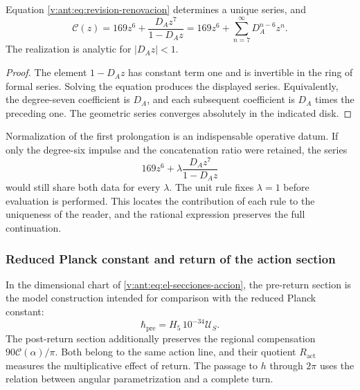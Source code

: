 \begin{proposition}
Equation \eqref{v:ant:eq:revision-renovacion} determines a unique series, and
\[
 \mathscr C(z)=169z^6+\frac{D_Az^7}{1-D_Az}
             =169z^6+\sum_{n=7}^{\infty}D_A^{n-6}z^n.
\]
The realization is analytic for \(|D_Az|<1\).
\end{proposition}
\begin{proof}
The element \(1-D_Az\) has constant term one and is invertible
in the ring of formal series. Solving the equation produces the displayed
series. Equivalently, the degree-seven coefficient is \(D_A\),
and each subsequent coefficient is \(D_A\) times the preceding one. The
geometric series converges absolutely in the indicated disk.
\end{proof}

Normalization of the first prolongation is an indispensable operative
datum. If only the degree-six impulse and the concatenation ratio
were retained, the series
\[
 169z^6+\lambda\frac{D_Az^7}{1-D_Az}
\]
would still share both data for every \(\lambda\).
The unit rule fixes \(\lambda=1\) before evaluation is performed.
This locates the contribution of each rule to the uniqueness of the
reader, and the rational expression preserves the full continuation.

\subsubsection{Reduced Planck constant and return of the action section}

In the dimensional chart of \eqref{v:ant:eq:el-secciones-accion}, the
pre-return section is the model construction intended for comparison
with the reduced Planck constant:
\[
 \hbar_{\mathrm{pre}}=H_5\,10^{-34}\mathcal U_S.
\]
The post-return section additionally preserves the regional
compensation \(90\mathscr C(\alpha)/\pi\). Both belong to the same
action line, and their quotient \(R_{\mathrm{act}}\) measures the multiplicative
effect of return. The passage to \(h\) through \(2\pi\) uses the relation
between angular parametrization and a complete turn.

